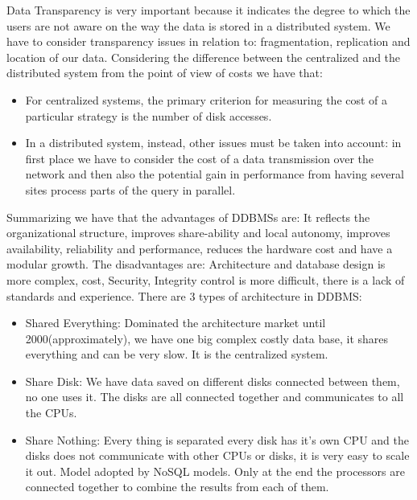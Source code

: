 \documentclass[a4page, 11pt]{article}
\begin{document}
Data Transparency is very important because it indicates the degree to which the users are not aware on the way the data is stored in a  distributed system. 
We have to consider transparency issues in relation to: fragmentation, replication and location of our data.
\newline
Considering the difference between the centralized and the distributed system from the point of view of costs we have that:
\begin{itemize}[noitemsep]
\item For centralized systems, the primary criterion for measuring the cost of a particular strategy is the number of disk accesses.
\item In a distributed system, instead, other issues must be taken into account: in first place we have to consider the cost of a data transmission over the network and then also the potential gain in performance from having several sites process parts of the query in parallel.
\end{itemize}
Summarizing we have that the advantages of DDBMSs are: It reflects the organizational structure, improves share-ability and local autonomy, improves availability, reliability and performance, reduces the hardware cost and have a modular growth.
The disadvantages are: Architecture and database design is more complex, cost, Security, Integrity control is more difficult, there is a lack of standards and experience.
\newline
There are 3 types of architecture in DDBMS:
\begin{itemize}
\item Shared Everything: Dominated the architecture market until 2000(approximately), we have one big complex costly data base, it shares everything and can be very slow. It is the centralized system.

\item Share Disk: We have data saved on different disks connected between them, no one uses it. The disks are all connected together and communicates to all the CPUs.

\item Share Nothing: Every thing is separated every disk has it's own CPU and the disks does not communicate with other CPUs or disks, it is very easy to scale it out. Model adopted by NoSQL models. Only at the end the processors are connected together to combine the results from each of them. 
\end{itemize}
\end{document}
